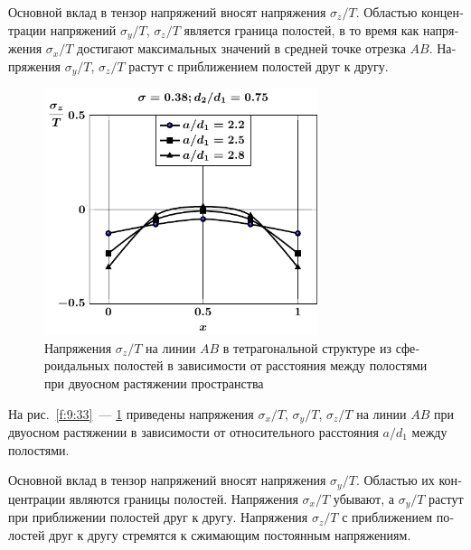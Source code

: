 \begin{russian}
Основной вклад в тензор напряжений вносят напряжения $\sigma_z/T$. Областью концентрации напряжений $\sigma_y/T$, $\sigma_z/T$ является граница полостей, в то время как напряжения $\sigma_x/T$ достигают максимальных значений в средней точке отрезка $AB$. Напряжения $\sigma_y/T$, $\sigma_z/T$ растут с приближением полостей друг к другу.

\begin{figure}[h!]
\centering
\includegraphics[width=8cm]{cav8-a-d75-t2-sig_z-ab.pdf}
\caption{Напряжения $\sigma_z/T$ на линии $AB$ в тетрагональной структуре из сфероидальных полостей в зависимости от расстояния между полостями при двуосном растяжении пространства}
\label{f:9:35}
\end{figure}

На рис.~\ref{f:9:33}~--- \ref{f:9:35} приведены напряжения $\sigma_x/T$, $\sigma_y/T$, $\sigma_z/T$ на линии $AB$ при двуосном растяжении в зависимости от относительного расстояния $a/d_1$ между полостями.

Основной вклад в тензор напряжений вносят напряжения $\sigma_y/T$. Областью их концентрации являются границы полостей. Напряжения $\sigma_x/T$ убывают, а $\sigma_y/T$ растут при приближении полостей друг к другу. Напряжения $\sigma_z/T$ с приближением полостей друг к другу стремятся к сжимающим постоянным напряжениям.

%


\end{russian}
